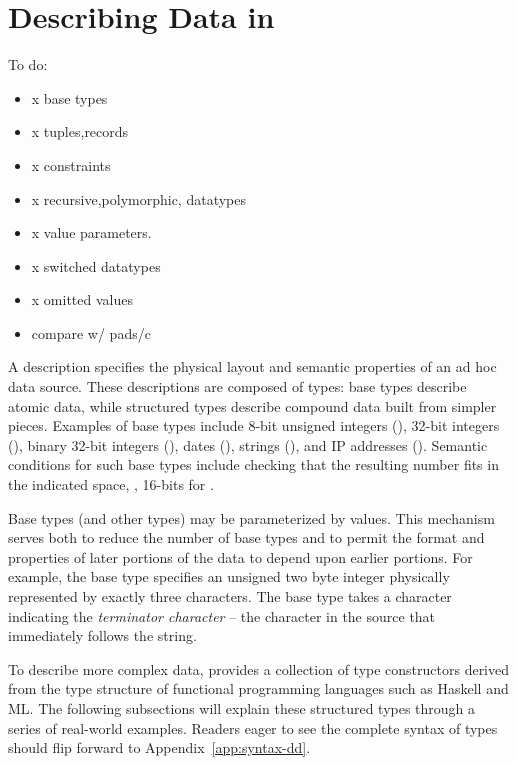 \newcommand{\pvalue}{???}
\section{Describing Data in \padsmlbig{}}
\label{sec:padsml-overview}

To do:
\begin{itemize}
\item x base types
\item x tuples,records
\item x constraints
\item x recursive,polymorphic, datatypes
\item x value parameters.
\item x switched datatypes
\item x omitted values
\item compare w/ pads/c
\end{itemize}

A \padsml{} description specifies the physical layout and semantic
properties of an ad hoc data source.  
These descriptions are composed of types: 
base types describe atomic data, while structured
types describe compound data built from simpler pieces.  Examples of
base types include 8-bit unsigned integers (), 32-bit
integers (), binary 32-bit integers (), dates
(), strings (), and IP addresses ().
Semantic conditions for such base types include checking that the
resulting number fits in the indicated space, \ie, 16-bits for
.

Base types (and other types) may be parameterized by values.  This
mechanism serves both to reduce the number of base types and to permit
the format and properties of later portions of the data to depend upon
earlier portions.  For example, the base type 
specifies an unsigned two byte integer physically represented by
exactly three characters. The base type  takes 
a character indicating the \textit{terminator character} -- the character in the
source that immediately follows the string. 

To describe more complex data, \padsml{} provides a collection of
type constructors derived from the type structure of functional
programming languages such as Haskell and ML.  The following
subsections will explain these structured types through a series 
of real-world examples.  Readers eager to see the complete syntax
of types should flip forward to Appendix~\ref{app:syntax-dd}.

